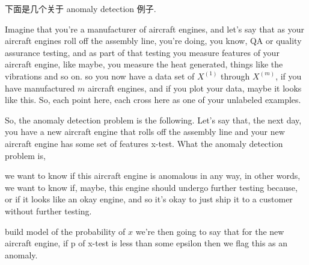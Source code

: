 \documentclass{article}
\begin{document}
下面是几个关于 anomaly detection 例子.
\begin{example}
Imagine that you're a manufacturer of aircraft engines, and let's say that as your aircraft engines roll off the assembly line, 
you're doing, you know, QA or quality assurance testing, and as part of that testing you measure features of your aircraft engine, like maybe, 
you measure the heat generated, things like the vibrations and so on.
so you now have a data set of $X^{(1)}$ through $X^{(m)}$, if you have manufactured $m$ aircraft engines,
and if you plot your data, maybe it looks like this.
So, each point here, each cross here as one of your unlabeled examples. 

So, the anomaly detection problem is the following. 
Let's say that, the next day, you have a new aircraft engine that rolls off the assembly line and your new aircraft engine has some set of features x-test. 
What the anomaly detection problem is,

we want to know if this aircraft engine is anomalous in any way, in other words, we want to know if, maybe, this engine should undergo further testing because, or if it looks like an okay engine, and so it's okay to just ship it to a customer without further testing.

build model of the probability of $x$
we're then going to say that for the new aircraft engine, if p of x-test is less than some epsilon then we flag this as an anomaly.
\end{example}
\end{document}
